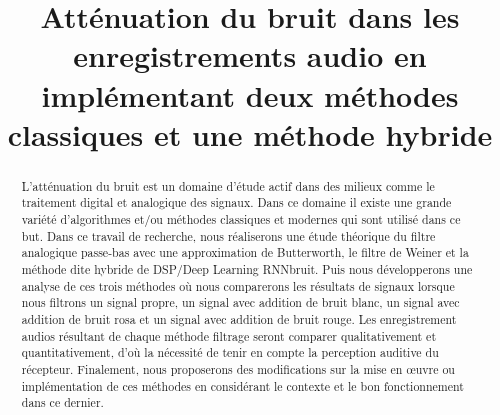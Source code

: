 \documentclass[conference,onecolumn]{IEEEtran}
\begin{document}
\title{Atténuation du bruit dans les enregistrements audio en implémentant deux méthodes classiques et une méthode hybride \\
}

\author{
\and
{}
\and
{}
}

\maketitle

\begin{abstract}
L’atténuation du bruit est un domaine d’étude actif dans des milieux comme le traitement digital et analogique des signaux. Dans ce domaine il existe une grande variété d’algorithmes et/ou méthodes classiques et modernes qui sont utilisé dans ce but. Dans ce travail de recherche, nous réaliserons une étude théorique du filtre analogique passe-bas avec une approximation de Butterworth, le filtre de Weiner et la méthode dite hybride de DSP/Deep Learning RNNbruit. Puis nous développerons une analyse de ces trois méthodes où nous comparerons les résultats de signaux lorsque nous filtrons un signal propre, un signal avec addition de bruit blanc, un signal avec addition de bruit rosa et un signal avec addition de bruit rouge. Les enregistrement audios résultant de chaque méthode filtrage seront comparer qualitativement et quantitativement, d’où la nécessité de tenir en compte la perception auditive du récepteur. Finalement, nous proposerons des modifications sur la mise en œuvre ou implémentation de ces méthodes en considérant le contexte et le bon fonctionnement dans ce dernier. 
\end{abstract}
\end{document}
